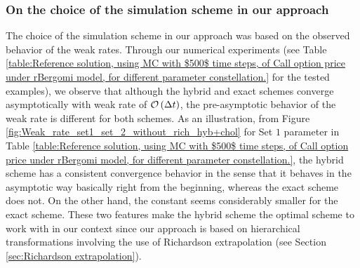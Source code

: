 \subsubsection{On the choice of the simulation scheme in our approach}\label{sec: choice of simulation scheme}
The choice of the simulation scheme in our approach was based on the observed behavior of the weak rates. Through our numerical experiments (see Table \ref{table:Reference solution, using MC with $500$ time steps, of Call option price under rBergomi model, for different parameter constellation.} for the tested examples), we observe that although the hybrid and exact schemes  converge asymptotically with weak rate of ${\mathcal{O}}\left(\Delta t\right)$, the pre-asymptotic behavior of the weak rate is different for both schemes. As an illustration, from Figure \ref{fig:Weak_rate_set1_set_2_without_rich_hyb+chol} for Set $1$ parameter in Table \ref{table:Reference solution, using MC with $500$ time steps, of Call option price under rBergomi model, for different parameter constellation.}, the hybrid scheme  has a consistent convergence behavior in the sense that it behaves in the asymptotic way basically right from the beginning, whereas the exact scheme does not. On the other
hand, the constant  seems considerably smaller for the exact scheme. These two features  make the hybrid scheme the optimal scheme  to work with in our context since our approach is based on hierarchical transformations involving the use of Richardson extrapolation (see Section \ref{sec:Richardson extrapolation}).
\FloatBarrier
